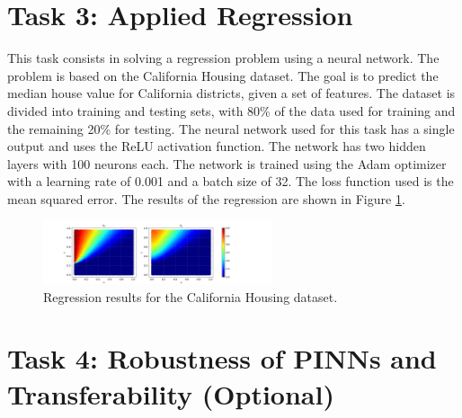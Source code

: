 \documentclass[unicode,11pt,a4paper,oneside,numbers=endperiod,openany]{scrartcl}
\begin{document}
\section{Task 3: Applied Regression}
This task consists in solving a regression problem using a neural network. The
problem is based on the California Housing dataset. The goal is to predict the
median house value for California districts, given a set of features. The
dataset is divided into training and testing sets, with 80\% of the data used
for training and the remaining 20\% for testing. The neural network used for
this task has a single output and uses the ReLU activation function. The network
has two hidden layers with 100 neurons each. The network is trained using the
Adam optimizer with a learning rate of 0.001 and a batch size of 32. The loss
function used is the mean squared error. The results of the regression are shown
in Figure \ref{fig:task3}.
\begin{figure}[h]
    \centering
    \includegraphics[width=0.6\textwidth]{../Proj1_Y24/Task3/output.png}
    \caption{Regression results for the California Housing dataset.}
    \label{fig:task3}
\end{figure}
\section{Task 4: Robustness of PINNs and Transferability (Optional)}
\end{document}
